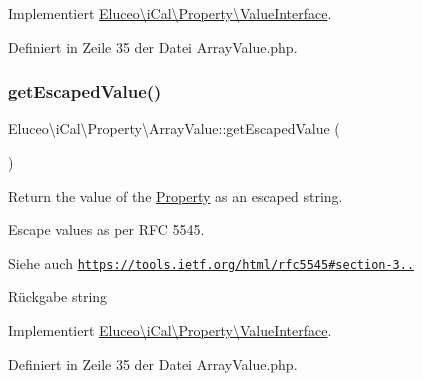 Implementiert \mbox{\hyperlink{interface_eluceo_1_1i_cal_1_1_property_1_1_value_interface_a408412ae5d11fd3f239c7985aede8c32}{Eluceo\textbackslash{}i\+Cal\textbackslash{}\+Property\textbackslash{}\+Value\+Interface}}.



Definiert in Zeile 35 der Datei Array\+Value.\+php.

\mbox{\label{class_eluceo_1_1i_cal_1_1_property_1_1_array_value_ac3af9696c29dc74c2e1ab7ca220c4228}} 
\subsubsection{\texorpdfstring{get\+Escaped\+Value()}{getEscapedValue()}\hspace{0.1cm}{\footnotesize\ttfamily [2/3]}}
{\footnotesize\ttfamily Eluceo\textbackslash{}i\+Cal\textbackslash{}\+Property\textbackslash{}\+Array\+Value\+::get\+Escaped\+Value (\begin{DoxyParamCaption}{ }\end{DoxyParamCaption})}

Return the value of the \mbox{\hyperlink{class_eluceo_1_1i_cal_1_1_property}{Property}} as an escaped string.

Escape values as per R\+FC 5545.

\begin{DoxySeeAlso}{Siehe auch}
\href{https://tools.ietf.org/html/rfc5545#section-3.3.11}{\tt https\+://tools.\+ietf.\+org/html/rfc5545\#section-\/3..}
\end{DoxySeeAlso}
\begin{DoxyReturn}{Rückgabe}
string 
\end{DoxyReturn}


Implementiert \mbox{\hyperlink{interface_eluceo_1_1i_cal_1_1_property_1_1_value_interface_a408412ae5d11fd3f239c7985aede8c32}{Eluceo\textbackslash{}i\+Cal\textbackslash{}\+Property\textbackslash{}\+Value\+Interface}}.



Definiert in Zeile 35 der Datei Array\+Value.\+php.

\mbox{\label{class_eluceo_1_1i_cal_1_1_property_1_1_array_value_ac3af9696c29dc74c2e1ab7ca220c4228}} 
